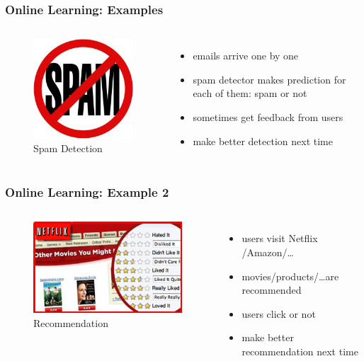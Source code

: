 \documentclass{beamer}
\begin{document}
\begin{frame}
\frametitle{Online Learning: Examples}

\begin{columns}
\begin{figure}
\includegraphics[scale = 0.4]{spam}
\caption{Spam Detection}
\end{figure}
\begin{itemize}
\item emails arrive one by one
\pause
\item spam detector makes prediction for each of them: {\color{blue}spam or not}
\pause
\item sometimes get {\color{blue}feedback} from users
\pause
\item make better detection next time  
\end{itemize}

\end{columns}

\end{frame}

\begin{frame}
\frametitle{Online Learning: Example 2}
\begin{columns}
\begin{figure}
\includegraphics[scale = 0.4]{recommendation}
\caption{Recommendation}
\end{figure}
\begin{itemize}
\item users visit Netflix /Amazon/\ldots
\pause
\item movies/products/\ldots are recommended 
\pause
\item users {\color{blue}click or not}
\pause
\item make better recommendation next time   
\end{itemize}

\end{columns}


\end{frame}
\end{document}
